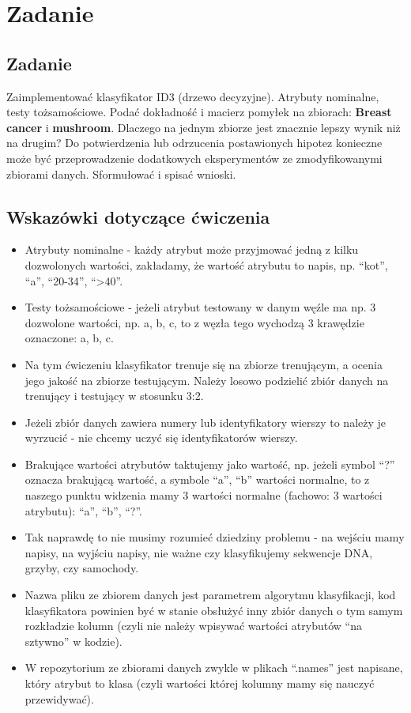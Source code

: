 \section{Zadanie}
\subsection{Zadanie}
Zaimplementować klasyfikator ID3 (drzewo decyzyjne). Atrybuty nominalne, testy
tożsamościowe. Podać dokładność i macierz pomyłek na zbiorach: \textbf{Breast cancer} i
\textbf{mushroom}. Dlaczego na jednym zbiorze jest znacznie lepszy wynik niż na drugim?
Do potwierdzenia lub odrzucenia postawionych hipotez konieczne może być
przeprowadzenie dodatkowych eksperymentów ze zmodyfikowanymi zbiorami danych.
Sformułować i spisać wnioski.

\subsection{Wskazówki dotyczące ćwiczenia}
\begin{itemize}
  \item Atrybuty nominalne - każdy atrybut może przyjmować jedną z kilku
    dozwolonych wartości, zakładamy, że wartość atrybutu to napis, np. ``kot'',
    ``a'', ``20-34'', ``>40''.
  \item Testy tożsamościowe - jeżeli atrybut testowany w danym węźle ma np. 3
    dozwolone wartości, np. a, b, c, to z węzła tego wychodzą 3 krawędzie
    oznaczone: a, b, c.
  \item Na tym ćwiczeniu klasyfikator trenuje się na zbiorze trenującym, a
    ocenia jego jakość na zbiorze testującym. Należy losowo podzielić zbiór
    danych na trenujący i testujący w stosunku 3:2.
  \item Jeżeli zbiór danych zawiera numery lub identyfikatory wierszy to należy
    je wyrzucić - nie chcemy uczyć się identyfikatorów wierszy.
  \item Brakujące wartości atrybutów taktujemy jako wartość, np. jeżeli symbol
    ``?'' oznacza brakującą wartość, a symbole ``a'', ``b'' wartości normalne, to z
    naszego punktu widzenia mamy 3 wartości normalne (fachowo: 3 wartości
    atrybutu): ``a'', ``b'', ``?''.
  \item Tak naprawdę to nie musimy rozumieć dziedziny problemu - na wejściu mamy
    napisy, na wyjściu napisy, nie ważne czy klasyfikujemy sekwencje DNA,
    grzyby, czy samochody.
  \item Nazwa pliku ze zbiorem danych jest parametrem algorytmu klasyfikacji,
    kod klasyfikatora powinien być w stanie obsłużyć inny zbiór danych o tym
    samym rozkładzie kolumn (czyli nie należy wpisywać wartości atrybutów ``na
    sztywno'' w kodzie).
  \item W repozytorium ze zbiorami danych zwykle w plikach ``.names'' jest
    napisane, który atrybut to klasa (czyli wartości której kolumny mamy się
    nauczyć przewidywać).
\end{itemize}
